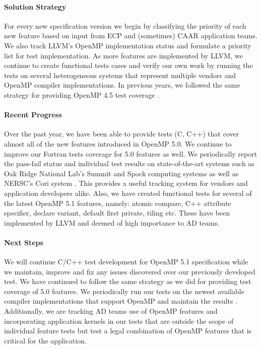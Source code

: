 \paragraph{Solution Strategy}
 For every new specification version we begin by classifying the priority of each new feature based on input from ECP and (sometimes) CAAR application teams. We also track LLVM's OpenMP implementation status and formulate a priority list for test implementation. As more features are implemented by LLVM, we continue to create functional tests cases and verify our own work by running the tests on several heterogeneous systems that represent multiple vendors and OpenMP compiler implementations. In previous years, we followed the same strategy for providing OpenMP 4.5 test coverage \cite{vandv2019}.

\paragraph{Recent Progress}
Over the past year, we have been able to provide tests (C, C++) that cover almost all of the new features introduced in OpenMP 5.0. We continue to improve our Fortran tests coverage for 5.0 features as well. We periodically report the pass-fail status and individual test results on state-of-the-art systems such as Oak Ridge National Lab's Summit and Spock computing systems as well as NERSC's Cori system \cite{sollvevvwebsite}. This provides a useful tracking system for vendors and application developers alike. Also, we have created functional tests for several of the latest OpenMP 5.1 features, namely: atomic compare, C++ attribute specifier, declare variant, default first private, tiling etc. These have been implemented by LLVM and deemed of high importance to AD teams. 

\paragraph{Next Steps}
We will continue C/C++ test development for OpenMP 5.1 specification while we maintain, improve and fix any issues discovered over our previously developed test. We have continued to follow the same strategy as we did for providing test coverage of 5.0 features. We periodically run our tests on the newest available compiler implementations that support OpenMP and maintain the results \cite{sollvevvwebsite}. Additionally, we are tracking AD teams use of OpenMP features and incorporating application kernels in our tests that are outside the scope of individual feature tests but test a legal combination of OpenMP features that is critical for the application.